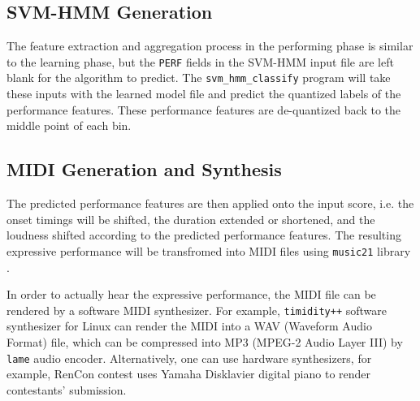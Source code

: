 \subsection{SVM-HMM Generation}
The feature extraction and aggregation process in the performing phase is similar to the learning phase, but the \texttt{PERF} fields in the SVM-HMM input file are left blank for the algorithm to predict. The \texttt{svm\_hmm\_classify} program will take these inputs with the learned model file and predict the quantized labels of the performance features. These performance features are de-quantized back to the middle point of each bin. 

      
\subsection{MIDI Generation and Synthesis}

The predicted performance features are then applied onto the input score, i.e. the onset timings will be shifted, the duration extended or shortened, and the loudness shifted according to the predicted performance features. The resulting expressive performance will be transfromed into MIDI files using \texttt{music21} library \cite{music21}.%

In order to actually hear the expressive performance, the MIDI file can be rendered by a software MIDI synthesizer. %
For example, \texttt{timidity++} software synthesizer for Linux can render the MIDI into a WAV (Waveform Audio Format) file, which can be compressed into MP3 (MPEG-2 Audio Layer III) by \texttt{lame} audio encoder. Alternatively, one can use hardware synthesizers, for example, RenCon \cite{RenCon} contest uses Yamaha Disklavier digital piano to render contestants' submission.

